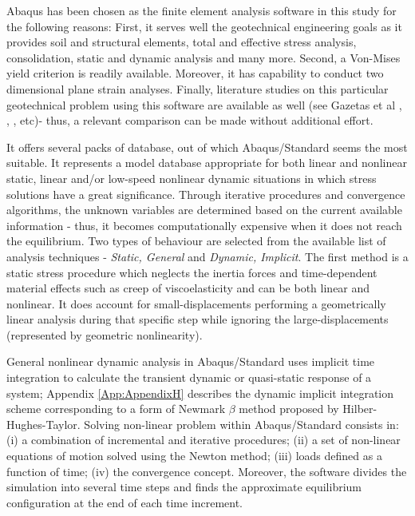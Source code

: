 \documentclass[11pt,a4paper]{report}
\begin{document}
Abaqus has been chosen as the finite element analysis software in this study for the following
reasons: First, it serves well the geotechnical engineering goals as it provides soil and structural elements, total and effective stress analysis, consolidation, static and dynamic analysis and many more. Second, a Von-Mises yield criterion is readily available. Moreover, it has capability to conduct two dimensional plane strain analyses. Finally, literature studies on this particular geotechnical problem using this software are available as well (see Gazetas et al \cite{gazetas2013can}, \cite{anastasopoulos2010soil}, \cite{anastasopoulos2014simplified}, etc)- thus, a relevant comparison can be made without additional effort. 

It offers several packs of database, out of which Abaqus/Standard seems the most suitable. It represents a model database appropriate for both linear and nonlinear static, linear and/or low-speed nonlinear dynamic situations in which stress solutions have a great significance. Through iterative procedures and convergence algorithms, the unknown variables are determined based on the current available information - thus, it becomes computationally expensive when it does not reach the equilibrium. Two types of behaviour are selected from the available list of analysis techniques - \textit{Static, General} and \textit{Dynamic, Implicit}. The first method is a static stress procedure which neglects the inertia forces and time-dependent material effects such as creep of viscoelasticity and can be both linear and nonlinear. It does account for small-displacements performing a geometrically linear analysis during that specific step while ignoring the large-displacements (represented by geometric nonlinearity).

General nonlinear dynamic analysis in Abaqus/Standard uses implicit time integration to calculate the transient dynamic or quasi-static response of a system; Appendix \ref{App:AppendixH} describes the dynamic implicit integration scheme corresponding to a form of Newmark $\beta$ method proposed by Hilber-Hughes-Taylor. Solving non-linear problem within Abaqus/Standard consists in: (i) a combination of incremental and iterative procedures; (ii) a set of non-linear equations of motion solved using the Newton method; (iii) loads defined as a function of time; (iv) the convergence concept. Moreover, the software divides the simulation into several time steps and finds the approximate equilibrium configuration at the end of each time increment.
\end{document}
